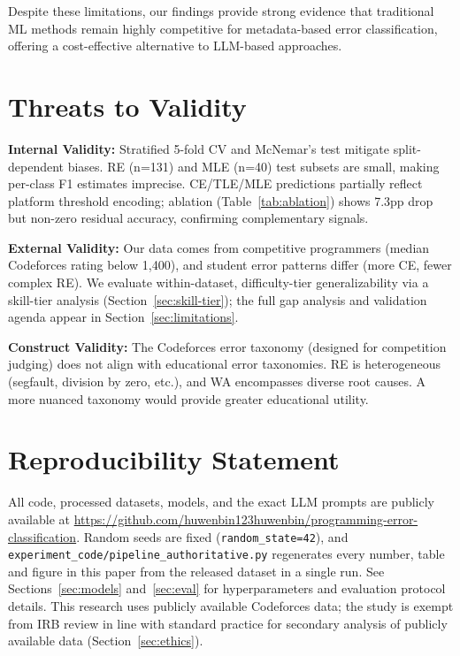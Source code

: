 \documentclass[acmsmall]{acmart}
\begin{document}
Despite these limitations, our findings provide strong evidence that
traditional ML methods remain highly competitive for metadata-based error
classification, offering a cost-effective alternative to LLM-based approaches.

\section{Threats to Validity}\label{sec:threats}

\textbf{Internal Validity:} Stratified 5-fold CV and McNemar's test mitigate
split-dependent biases. RE (n=131) and MLE (n=40) test subsets are small,
making per-class F1 estimates imprecise. CE/TLE/MLE predictions partially reflect
platform threshold encoding; ablation (Table~\ref{tab:ablation}) shows 7.3pp
drop but non-zero residual accuracy, confirming complementary signals.

\textbf{External Validity:} Our data comes from competitive programmers
(median Codeforces rating below 1,400), and student error patterns differ
(more CE, fewer complex RE). We evaluate within-dataset, difficulty-tier generalizability via a
skill-tier analysis (Section~\ref{sec:skill-tier}); the full gap analysis and
validation agenda appear in Section~\ref{sec:limitations}.

\textbf{Construct Validity:} The Codeforces error taxonomy (designed for
competition judging) does not align with educational error taxonomies. RE is
heterogeneous (segfault, division by zero, etc.), and WA encompasses diverse
root causes. A more nuanced taxonomy would provide greater educational
utility.

\section*{Reproducibility Statement}

\begin{sloppypar}\raggedright
All code, processed datasets, models, and the exact LLM prompts are publicly
available at
\url{https://github.com/huwenbin123huwenbin/programming-error-classification}. Random
seeds are fixed (\texttt{random\_state=42}), and
\texttt{experiment\_code/pipeline\_authoritative.py} regenerates every number,
table and figure in this paper from the released dataset in a single run. See
Sections~\ref{sec:models} and~\ref{sec:eval} for hyperparameters and evaluation
protocol details. This research uses publicly
available Codeforces data; the study is exempt from IRB review in line with
standard practice for secondary analysis of publicly available data
(Section~\ref{sec:ethics}).
\end{sloppypar}
\end{document}
